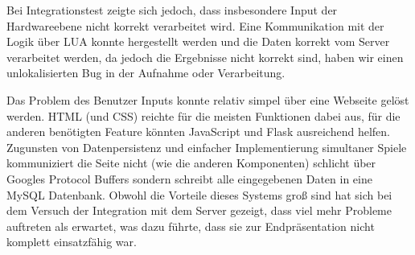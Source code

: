  Bei Integrationstest zeigte sich jedoch, dass insbesondere Input der Hardwareebene nicht korrekt verarbeitet wird. 
 Eine Kommunikation mit der Logik über LUA konnte hergestellt werden und die Daten korrekt vom Server verarbeitet werden, 
 da jedoch die Ergebnisse nicht korrekt sind, haben wir einen unlokalisierten Bug in der Aufnahme oder Verarbeitung.
 
Das Problem des Benutzer Inputs konnte relativ simpel über eine Webseite gelöst werden. HTML (und CSS) reichte für die 
meisten Funktionen dabei aus, für die anderen benötigten Feature könnten JavaScript und Flask ausreichend helfen. 
Zugunsten von Datenpersistenz und einfacher Implementierung simultaner Spiele kommuniziert die Seite nicht (wie die anderen Komponenten) 
schlicht über Googles Protocol Buffers sondern schreibt alle eingegebenen Daten in eine MySQL Datenbank. Obwohl die Vorteile dieses Systems 
groß sind hat sich bei dem Versuch der Integration mit dem Server gezeigt, dass viel mehr Probleme auftreten als erwartet, was dazu führte, 
dass sie zur Endpräsentation nicht komplett einsatzfähig war.


